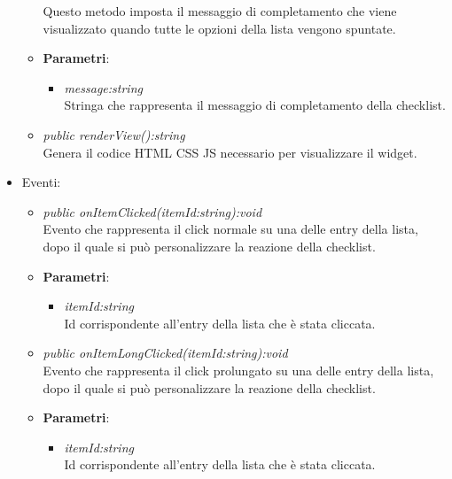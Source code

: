 \begin{itemize}
\begin{itemize}
	Questo metodo imposta il messaggio di completamento che viene visualizzato quando tutte le opzioni della lista vengono spuntate.
		\item{\textbf{Parametri}: \begin{itemize}
		\item \textit{message:string}\\
		Stringa che rappresenta il messaggio di completamento della checklist.
		\end{itemize}}
	\item \textit{public renderView():string}\\
	Genera il codice HTML CSS JS necessario per visualizzare il widget.
	\end{itemize}
\item{Eventi}:
	\begin{itemize}
	\item \textit{public onItemClicked(itemId:string):void}\\
	Evento che rappresenta il click normale su una delle entry della lista, dopo il quale si può personalizzare la reazione della checklist.
		\item{\textbf{Parametri}: \begin{itemize}
		\item \textit{itemId:string}\\
		Id corrispondente all'entry della lista che è stata cliccata.
		\end{itemize}}
	\item \textit{public onItemLongClicked(itemId:string):void}\\
	Evento che rappresenta il click prolungato su una delle entry della lista, dopo il quale si può personalizzare la reazione della checklist.
		\item{\textbf{Parametri}: \begin{itemize}
		\item \textit{itemId:string}\\
		Id corrispondente all'entry della lista che è stata cliccata.
		\end{itemize}}
	\end{itemize}
\end{itemize}

